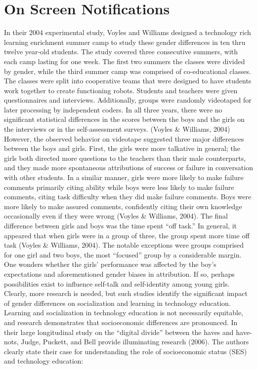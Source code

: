 \section{On Screen Notifications}
In their 2004 experimental study, Voyles and Williams designed a technology rich learning enrichment summer camp to study these gender differences in ten thru twelve year-old students.  The study covered three consecutive summers, with each camp lasting for one week.  The first two summers the classes were divided by gender, while the third summer camp was comprised of co-educational classes.  The classes were split into cooperative teams that were designed to have students work together to create functioning robots.  Students and teachers were given questionnaires and interviews.  Additionally, groups were randomly videotaped for later processing by independent coders.  
In all three years, there were no significant statistical differences in the scores between the boys and the girls on the interviews or in the self-assessment surveys. (Voyles \& Williams, 2004)  However, the observed behavior on videotape suggested three major differences between the boys and girls.  First, the girls were more talkative in general; the girls both directed more questions to the teachers than their male counterparts, and they made more spontaneous attributions of success or failure in conversation with other students.  In a similar manner, girls were more likely to make failure comments primarily citing ability while boys were less likely to make failure comments, citing task difficulty when they did make failure comments.  Boys were more likely to make assured comments, confidently citing their own knowledge occasionally even if they were wrong (Voyles \& Williams, 2004).  
The final difference between girls and boys was the time spent “off task.” In general, it appeared that when girls were in a group of three, the group spent more time off task (Voyles \& Williams, 2004). The notable exceptions were groups comprised for one girl and two boys, the most “focused” group by a considerable margin. One wonders whether the girls’ performance was affected by the boy’s expectations and aforementioned gender biases in attribution. If so, perhaps possibilities exist to influence self-talk and self-identity among young girls. Clearly, more research is needed, but such studies identify the significant impact of gender differences on socialization and learning in technology education. 
Learning and socialization in technology education is not necessarily equitable, and research demonstrates that socioeconomic differences are pronounced.  In their large longitudinal study on the “digital divide” between the haves and have-nots, Judge, Puckett, and Bell provide illuminating research (2006).  The authors clearly state their case for understanding the role of socioeconomic status (SES) and technology education:
